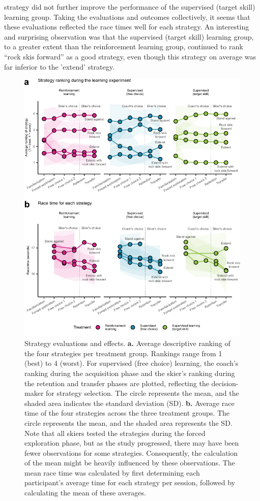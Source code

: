 \documentclass[pdflatex,sn-mathphys-num]{sn-jnl}%
\theoremstyle{thmstyleone}%
\theoremstyle{thmstyletwo}%
\theoremstyle{thmstylethree}%
\begin{document}
strategy did not further improve the performance of the supervised (target skill) learning group. Taking the evaluations and outcomes collectively, it seems that these evaluations reflected the race times well for each strategy. An interesting and surprising observation was that the supervised (target skill) learning group, to a greater extent than the reinforcement learning group, continued to rank “rock skis forward” as a good strategy, even though this strategy on average was far inferior to the 'extend' strategy.


\begin{figure}[H]
\centering
\includegraphics[]{figures/figure_ranking_average_3.pdf}
\caption{Strategy evaluations and effects. \textbf{a. }Average descriptive ranking of the four strategies per treatment group. Rankings range from 1 (best) to 4 (worst). For supervised (free choice) learning, the coach's ranking during the acquisition phase and the skier's ranking during the retention and transfer phases are plotted, reflecting the decision- maker for strategy selection. The circle represents the mean, and the shaded area indicates the standard deviation (SD). \textbf{b.} Average race time of the four strategies across the three treatment groups. The circle represents the mean, and the shaded area represents the SD. Note that all skiers tested the strategies during the forced exploration phase, but as the study progressed, there may have been fewer observations for some strategies. Consequently, the calculation of the mean might be heavily influenced by these observations. The mean race time was calculated by first determining each participant's average time for each strategy per session, followed by calculating the mean of these averages.}\label{fig: rank}
\end{figure}
\end{document}
